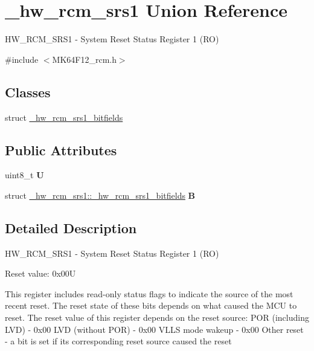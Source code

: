 \hypertarget{union__hw__rcm__srs1}{}\section{\+\_\+hw\+\_\+rcm\+\_\+srs1 Union Reference}
\label{union__hw__rcm__srs1}


H\+W\+\_\+\+R\+C\+M\+\_\+\+S\+R\+S1 -\/ System Reset Status Register 1 (RO)  




{\ttfamily \#include $<$M\+K64\+F12\+\_\+rcm.\+h$>$}

\subsection*{Classes}
\begin{DoxyCompactItemize}
\item 
struct \hyperlink{struct__hw__rcm__srs1_1_1__hw__rcm__srs1__bitfields}{\+\_\+hw\+\_\+rcm\+\_\+srs1\+\_\+bitfields}
\end{DoxyCompactItemize}
\subsection*{Public Attributes}
\begin{DoxyCompactItemize}
\item 
uint8\+\_\+t {\bfseries U}\hypertarget{union__hw__rcm__srs1_aec64e7260e9868981e264f6193cd6cb3}{}\label{union__hw__rcm__srs1_aec64e7260e9868981e264f6193cd6cb3}

\item 
struct \hyperlink{struct__hw__rcm__srs1_1_1__hw__rcm__srs1__bitfields}{\+\_\+hw\+\_\+rcm\+\_\+srs1\+::\+\_\+hw\+\_\+rcm\+\_\+srs1\+\_\+bitfields} {\bfseries B}\hypertarget{union__hw__rcm__srs1_ac5ac3ac9408c7cddae06ef4ca7a4d7bd}{}\label{union__hw__rcm__srs1_ac5ac3ac9408c7cddae06ef4ca7a4d7bd}

\end{DoxyCompactItemize}


\subsection{Detailed Description}
H\+W\+\_\+\+R\+C\+M\+\_\+\+S\+R\+S1 -\/ System Reset Status Register 1 (RO) 

Reset value\+: 0x00U

This register includes read-\/only status flags to indicate the source of the most recent reset. The reset state of these bits depends on what caused the M\+CU to reset. The reset value of this register depends on the reset source\+: P\+OR (including L\+VD) -\/ 0x00 L\+VD (without P\+OR) -\/ 0x00 V\+L\+LS mode wakeup -\/ 0x00 Other reset -\/ a bit is set if its corresponding reset source caused the reset 


